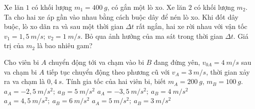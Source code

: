 \begin{vidu}
Xe lăn $1$ có khối lượng $m_1=400\ g$, có gắn một lò xo. Xe lăn $2$ có khối lượng $m_2$. Ta cho hai xe áp gần vào nhau bằng cách buộc dây để nén lò xo. Khi đốt dây buộc, lò xo dãn ra và sau một thời gian $\Delta t$ rất ngắn, hai xe rời nhau với vận tốc $v_1=1,5\ m / s$; $v_2=1\ m / s$. Bỏ qua ảnh hưởng của ma sát trong thời gian $\Delta t$. Giá trị của $m_2$ là bao nhiêu gam?
 \end{vidu}
\begin{vidu}
Cho viên bi $A$ chuyển động tới va chạm vào bi $B$ đang đứng yên, $v_{0A}=4\ m / s$ sau va chạm bi $A$ tiếp tục chuyển động theo phương cũ với $v_A=3\ m / s$, thời gian xảy ra va chạm là $0,4\ s$. Tính gia tốc của hai viên bi, biết $m_{A}=200\ g$, $m_{B}=100\ g$.
\choice
{\True $a_{A}=-2,5\ m / s^2;\  a_{B}=5\ m / s^2$}
{$a_{A}=-3,5\ m / s^2;\ a_{B}=4\ m / s^2$}
{$a_{A}=4,5\ m / s^2;\ a_{B}=6\ m / s^2$}
{$a_{A}=5\ m / s^2;\ a_{B}=3\ m / s^2$}
 \end{vidu}

